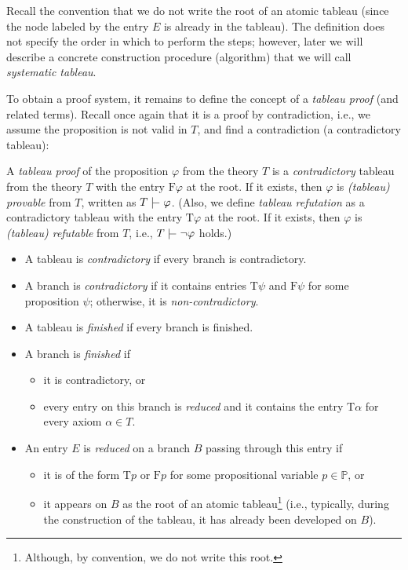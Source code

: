Recall the convention that we do not write the root of an atomic tableau (since the node labeled by the entry $E$ is already in the tableau). The definition does not specify the order in which to perform the steps; however, later we will describe a concrete construction procedure (algorithm) that we will call \emph{systematic tableau}.

To obtain a proof system, it remains to define the concept of a \emph{tableau proof} (and related terms). Recall once again that it is a proof by contradiction, i.e., we assume the proposition is not valid in $T$, and find a contradiction (a contradictory tableau):

\begin{definition}
A \emph{tableau proof} of the proposition $\varphi$ from the theory $T$ is a \emph{contradictory} tableau from the theory $T$ with the entry $\mathrm{F}\varphi$ at the root. If it exists, then $\varphi$ is \emph{(tableau) provable} from $T$, written as $T \proves \varphi$. (Also, we define \emph{tableau refutation} as a contradictory tableau with the entry $\mathrm{T}\varphi$ at the root. If it exists, then $\varphi$ is \emph{(tableau) refutable} from $T$, i.e., $T \proves \neg \varphi$ holds.)
\begin{itemize}
    \item A tableau is \emph{contradictory} if every branch is contradictory.
    \item A branch is \emph{contradictory} if it contains entries $\mathrm{T}\psi$ and $\mathrm{F}\psi$ for some proposition $\psi$; otherwise, it is \emph{non-contradictory}.
    \item A tableau is \emph{finished} if every branch is finished.
    \item A branch is \emph{finished} if 
    \begin{itemize}
        \item it is contradictory, or
        \item every entry on this branch is \emph{reduced} and it contains the entry $\mathrm{T}\alpha$ for every axiom $\alpha \in T$.
    \end{itemize}
     
    \item An entry $E$ is \emph{reduced} on a branch $B$ passing through this entry if 
    \begin{itemize}
        \item it is of the form $\mathrm{T}p$ or $\mathrm{F}p$ for some propositional variable $p \in \mathbb{P}$, or
        \item it appears on $B$ as the root of an atomic tableau\footnote{Although, by convention, we do not write this root.} (i.e., typically, during the construction of the tableau, it has already been developed on $B$).
    \end{itemize}
\end{itemize}
\end{definition}

